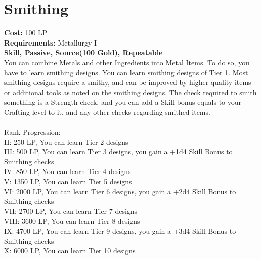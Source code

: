 \section{Smithing}\label{perk:smithing}
\textbf{Cost:} 100 LP\\
\textbf{Requirements:} Metallurgy I\\
\textbf{Skill, Passive, Source(100 Gold), Repeatable}\\
You can combine Metals and other Ingredients into Metal Items.
To do so, you have to learn smithing designs.
You can learn smithing designs of Tier 1.
Most smithing designs require a smithy, and can be improved by higher quality items or additional tools as noted on the smithing designs.
The check required to smith something is a Strength check, and you can add a Skill bonus equals to your Crafting level to it, and any other checks regarding smithed items.\\
\\
Rank Progression:\\
II: 250 LP, You can learn Tier 2 designs\\
III: 500 LP, You can learn Tier 3 designs, you gain a +1d4 Skill Bonus to Smithing checks\\
IV: 850 LP, You can learn Tier 4 designs\\
V: 1350 LP, You can learn Tier 5 designs\\
VI: 2000 LP, You can learn Tier 6 designs, you gain a +2d4 Skill Bonus to Smithing checks\\
VII: 2700 LP, You can learn Tier 7 designs\\
VIII: 3600 LP, You can learn Tier 8 designs\\
IX: 4700 LP, You can learn Tier 9 designs, you gain a +3d4 Skill Bonus to Smithing checks\\
X: 6000 LP, You can learn Tier 10 designs\\